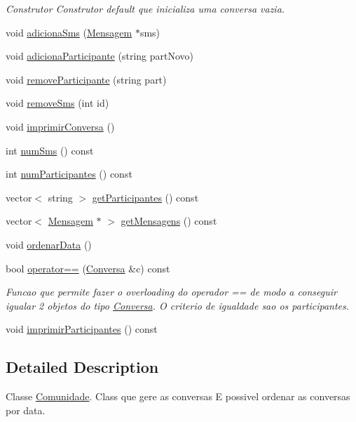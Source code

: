 \begin{DoxyCompactItemize}
\begin{DoxyCompactList}\small\item\em Construtor Construtor default que inicializa uma conversa vazia. \end{DoxyCompactList}\item 
void \hyperlink{class_conversa_aee6541eeaa269a26b14e7d5170ab82e0}{adiciona\+Sms} (\hyperlink{class_mensagem}{Mensagem} $\ast$sms)
\item 
void \hyperlink{class_conversa_ab7e050856c96cc40bd6dd16044b167cb}{adiciona\+Participante} (string part\+Novo)
\item 
void \hyperlink{class_conversa_adfa90ab666242fc6079cc847be1396e2}{remove\+Participante} (string part)
\item 
void \hyperlink{class_conversa_a85952428a550fe77c42347b487624027}{remove\+Sms} (int id)
\item 
void \hyperlink{class_conversa_a9bb99c60f68841f6a7a01c1c68db15df}{imprimir\+Conversa} ()
\item 
int \hyperlink{class_conversa_a35b1035a3f780e63963dc11d8cc9fcb8}{num\+Sms} () const 
\item 
int \hyperlink{class_conversa_ae206bbcfb7fe25d6cbca2a7dc9266b0e}{num\+Participantes} () const 
\item 
vector$<$ string $>$ \hyperlink{class_conversa_afe17736f50a6ab6b471be57c64da79dc}{get\+Participantes} () const 
\item 
vector$<$ \hyperlink{class_mensagem}{Mensagem} $\ast$ $>$ \hyperlink{class_conversa_a72d2a6000bbb9438417c456031bf8ced}{get\+Mensagens} () const 
\item 
void \hyperlink{class_conversa_a8f575a8d5137b94f5190e85998b01b8d}{ordenar\+Data} ()
\item 
bool \hyperlink{class_conversa_a3a7785ca7dfa6154bd33566d5fe2ed04}{operator==} (\hyperlink{class_conversa}{Conversa} \&c) const 
\begin{DoxyCompactList}\small\item\em Funcao que permite fazer o overloading do operador == de modo a conseguir igualar 2 objetos do tipo \hyperlink{class_conversa}{Conversa}. O criterio de igualdade sao os participantes. \end{DoxyCompactList}\item 
void \hyperlink{class_conversa_a6c783d4e16c1e7c76406eedbccd13da8}{imprimir\+Participantes} () const 
\end{DoxyCompactItemize}


\subsection{Detailed Description}
Classe \hyperlink{class_comunidade}{Comunidade}. Class que gere as conversas E possivel ordenar as conversas por data. 

